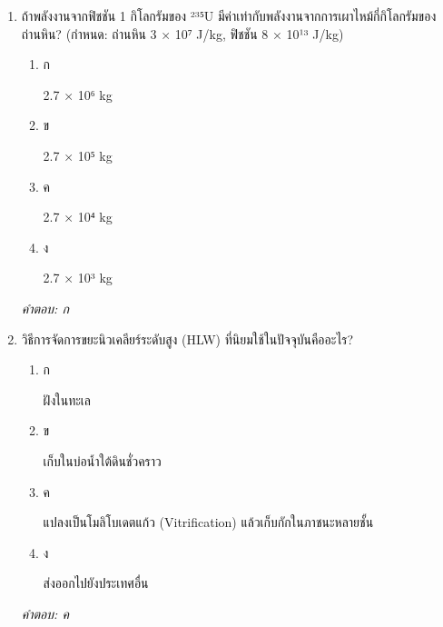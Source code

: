 \documentclass[12pt]{article}
\begin{document}
\begin{enumerate}[label=\arabic*., itemsep=0.5\baselineskip, topsep=0.5\baselineskip, leftmargin=*]
\item ถ้าพลังงานจากฟิชชัน 1 กิโลกรัมของ ²³⁵U มีค่าเท่ากับพลังงานจากการเผาไหม้กี่กิโลกรัมของถ่านหิน? (กำหนด: ถ่านหิน 3 × 10⁷ J/kg, ฟิชชัน 8 × 10¹³ J/kg)
\begin{enumerate}[label=\alph*)., itemsep=0.3\baselineskip, topsep=0.3\baselineskip]
\item ก\ 
\begin{minipage}[t]{0.9\linewidth}
\raggedright 2.7 × 10⁶ kg
\end{minipage}
\item ข\ 
\begin{minipage}[t]{0.9\linewidth}
\raggedright 2.7 × 10⁵ kg
\end{minipage}
\item ค\ 
\begin{minipage}[t]{0.9\linewidth}
\raggedright 2.7 × 10⁴ kg
\end{minipage}
\item ง\ 
\begin{minipage}[t]{0.9\linewidth}
\raggedright 2.7 × 10³ kg
\end{minipage}
\end{enumerate}
\vspace{-0.3\baselineskip}
\begin{small}
\textit{คำตอบ: ก}
\end{small}

\item วิธีการจัดการขยะนิวเคลียร์ระดับสูง (HLW) ที่นิยมใช้ในปัจจุบันคืออะไร?
\begin{enumerate}[label=\alph*)., itemsep=0.3\baselineskip, topsep=0.3\baselineskip]
\item ก\ 
\begin{minipage}[t]{0.9\linewidth}
\raggedright ฝังในทะเล
\end{minipage}
\item ข\ 
\begin{minipage}[t]{0.9\linewidth}
\raggedright เก็บในบ่อน้ำใต้ดินชั่วคราว
\end{minipage}
\item ค\ 
\begin{minipage}[t]{0.9\linewidth}
\raggedright แปลงเป็นโมลิโบเดตแก้ว (Vitrification) แล้วเก็บกักในภาชนะหลายชั้น
\end{minipage}
\item ง\ 
\begin{minipage}[t]{0.9\linewidth}
\raggedright ส่งออกไปยังประเทศอื่น
\end{minipage}
\end{enumerate}
\vspace{-0.3\baselineskip}
\begin{small}
\textit{คำตอบ: ค}
\end{small}


\end{enumerate}
\end{document}
